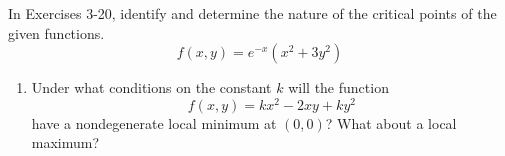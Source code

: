 \documentclass[12pt,letterpaper]{hmcpset}
\begin{document}
\begin{problem}[Colley 4.2.12]
    In Exercises 3-20, identify and determine the nature of the
    critical points of the given functions.
    \[
        f(x,y)=e^{-x}(x^2+3y^2)
    \]
\end{problem}
\begin{solution}
    \vfill
\end{solution}
\newpage


\begin{problem}[Colley 4.2.22a]
    \begin{enumerate}
        \item Under what conditions on the constant $k$ will the function
            \[
                f(x,y)=kx^2-2xy+ky^2
            \]
            have a nondegenerate local minimum at $(0,0)$? What about
            a local maximum?
    \end{enumerate}
\end{problem}
\begin{solution}
    \vfill
\end{solution}
\end{document}
